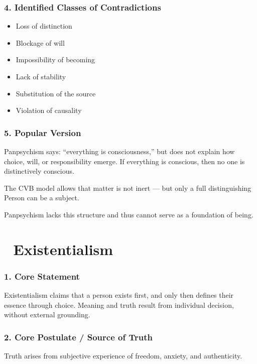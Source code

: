 \documentclass[12pt]{article}
\begin{document}
\subsubsection*{4. Identified Classes of Contradictions}

\begin{itemize}
\item Loss of distinction
\item Blockage of will
\item Impossibility of becoming
\item Lack of stability
\item Substitution of the source
\item Violation of causality
\end{itemize}

\subsubsection*{5. Popular Version}

Panpsychism says: ``everything is consciousness,'' but does not explain how choice, will, or responsibility emerge. If everything is conscious, then no one is distinctively conscious.

The CVB model allows that matter is not inert — but only a full distinguishing Person can be a subject.

Panpsychism lacks this structure and thus cannot serve as a foundation of being.


\section*{🔷 Existentialism}

\subsubsection*{1. Core Statement}

Existentialism claims that a person exists first, and only then defines their essence through choice. Meaning and truth result from individual decision, without external grounding.

\subsubsection*{2. Core Postulate / Source of Truth}

Truth arises from subjective experience of freedom, anxiety, and authenticity.
\end{document}
